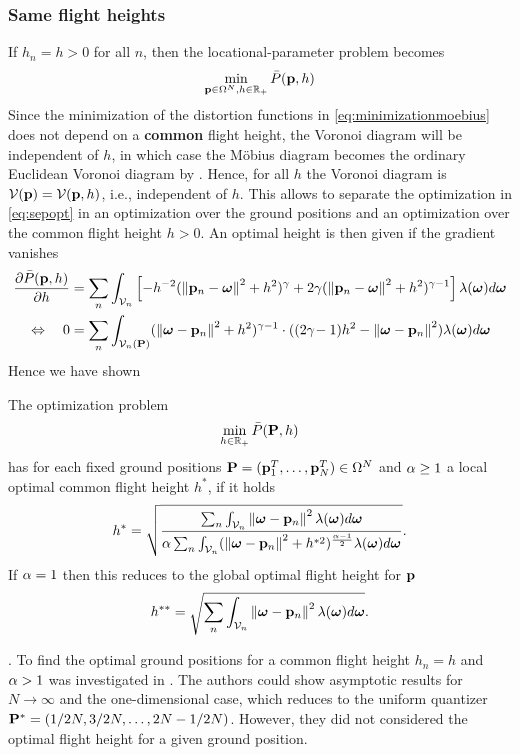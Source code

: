 \documentclass[smallabstract,smallcaptions]{dccpaper}
\newenvironment{remark}{\par\vspace{1.5ex}\noindent{\em Remark\/}.}{\par\vspace{1.5ex}}
\newcommand{\df}{\ensuremath{\lam}}         %
\newcommand{\bP}{\ensuremath{\vp}}          %
\newcommand{\Pbar}{\ensuremath{\bar{P}}}         %
\newcommand{\Vor}{\ensuremath{\mathcal{V}}}         %
\begin{document}
\subsubsection{Same flight heights}

If $h_n=h>0$ for all $n$, then the locational-parameter problem becomes
%
\begin{align}
  \min_{\bP\in\Omega^N,h\in\R_+} \Pbar(\bP,h) \label{eq:sepopt}
\end{align}
% 
Since the minimization of the distortion functions in \eqref{eq:minimizationmoebius}   does not depend on a {\bfseries
common} flight
height, the Voronoi diagram will be independent of $h$, in which case the Möbius diagram becomes the ordinary Euclidean
Voronoi diagram by .
%
Hence, for all $h$ the Voronoi diagram is $\Vor(\bP)=\Vor(\bP,h)$, i.e., independent of $h$. This allows to separate the
optimization in \eqref{eq:sepopt} in an optimization over the ground positions and an optimization over the common
flight height $h>0$. An optimal height is then given if the gradient vanishes
%
\begin{align}
  \frac{\partial \Pbar(\bP,h)}{\partial h} &= \sum_n{\int_{\Vor_n} \left[-h^{-2}(\Norm{\vp_n-\vome}^2 + h^2)^{\gam} + 2\gam 
    (\Norm{\vp_n-\vome}^2 +h^2)^{\gam-1}\right]
    \df(\vome)d \vome} \notag\\
  \LRA\quad 0 &= \sum_n\int_{\Vor_n(\vP)} (\Norm{\vome-\vp_n}^2+h^2)^{\gam-1} \cdot ((2\gam\!-1)h^2 -\Norm{\vome-\vp_n}^2)
  \df(\vome)d \vome
\end{align}
%
Hence we have shown
%
\begin{corollary}
  The optimization problem 
  \begin{align}
    \min_{h\in\R_+} \Pbar(\vP,h)
  \end{align}
  has for each fixed ground positions $\mathbf P =({\mathbf p}_1^T,\dots,{\mathbf p}_N^T)\in\Omega^N$ and $\alpha\geq 1$ a
  local optimal common flight height $h^*$, if it holds
  \begin{align}
     h^* = \sqrt{\frac{ \sum_n \int_{\Vor_n} \Norm{\vome-\vp_n}^2 \df(\vome)d\vome}{\alp\sum_n \int_{\Vor_n}
     (\Norm{\vome-\vp_n}^2+h^{*2})^{\frac{\alp-1}{2}} \df(\vome)d\vome}}.
   \end{align}
   If $\alpha=1$ then this reduces to the global optimal flight height for $\bP$ 
   \begin{align}
      h^{**} =  \sqrt{\sum_n \int_{\Vor_n} \Norm{\vome-\vp_n}^2 \df(\vome)d\vome}.
   \end{align}
\end{corollary}
%
\begin{remark}
  To find the optimal ground positions for a common flight height $h_n=h$ and $\alpha>1$ was investigated in \cite[Sec.III]{KSS18}.
  The authors could show asymptotic results for $N\to\infty$ and the one-dimensional case, which reduces to the uniform
  quantizer $\mathbf P ^*=(1/2N,3/2N,\dots,2N-1/2N)$. However, they did not considered the optimal flight height for a given ground
  position.
\end{remark}
 
\end{document}
